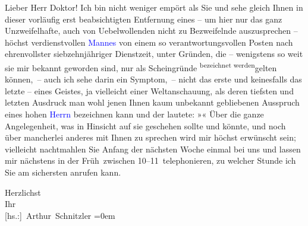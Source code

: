 \pstart{}Lieber Herr Doktor!\pend\vspace{0.5em}
\pstart
           Ich bin nicht weniger empört als Sie und sehe gleich Ihnen in dieser \introOben{}vorläufig erst\introOben{} beabsichtigten Entfernung eines – um hier nur
               das ganz Unzweifelhafte, auch von Uebelwollenden nicht zu Bezweifelnde auszusprechen
               – höchst verdienstvollen \textcolor{blue}{Mannes}\ledrightnote{{$\rightarrow$}\emph{\textcolor{blue}{Richard Rosenbaum}}} von einem so verantwortungsvollen Posten nach ehrenvollster
               siebzehnjähriger Dienstzeit\introOben{},\introOben{} unter Gründen, die \introOben{}–\introOben{} wenigstens so
               weit sie mir bekannt geworden sind, nur als Scheingründe \substVorne{}\textsuperscript{bezeichnet werden}\substDazwischen{}gelten\substHinten{} können, – auch ich sehe darin ein Symptom, – nicht das erste und keinesfalls
               das letzte – eines Geistes, ja vielleicht einer Weltanschauung, als deren tiefsten
               und letzten Ausdruck man wohl jenen Ihnen kaum unbekannt gebliebenen Ausspruch eines
               hohen \textcolor{blue}{Herrn}\ledrightnote{{$\rightarrow$}\emph{\textcolor{blue}{Karl I. von Österreich-Ungarn}}} bezeichnen kann
               und der lautete: »\label{K_L03768-1v}\label{K_L03768-1}« Über
               die ganze Angelegenheit, was in {\pb}Hinsicht auf sie
               geschehen sollte und könnte, und noch über mancherlei anderes mit Ihnen zu sprechen
               wird mir höchst erwünscht sein; vielleicht nachtmahlen Sie Anfang der nächsten Woche
               einmal bei uns und lassen mir nächstens in der Früh zwischen
               10–11 telephonieren, zu welcher
               Stunde ich Sie am sichersten anrufen kann.\pend
           
\pstart
           Herzlichst{\\[\baselineskip]}Ihr{\\[\baselineskip]}\spacefill\mbox{{[}hs.:{]} Arthur Schnitzler}\pend
           \leftskip=0em{}\endnumbering{}
\begin{anhang}
\end{anhang}
      